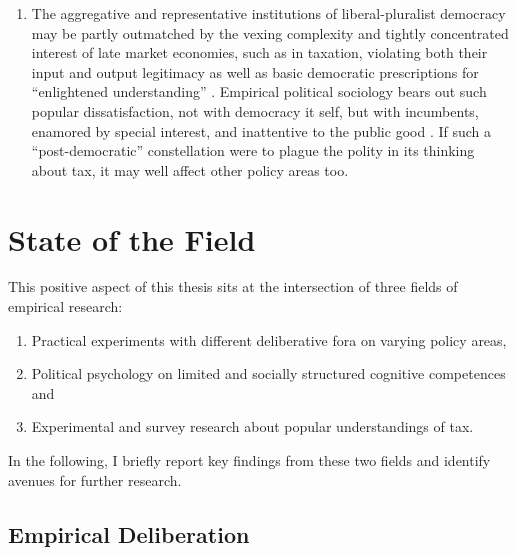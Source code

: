 \begin{enumerate}
	\item The aggregative and representative institutions of liberal-pluralist democracy may be partly outmatched by the vexing complexity \citep{Merton-1968-aa} and tightly concentrated interest \citep{Olson-1971-aa} of late market economies, such as in taxation, violating both their input and output legitimacy \citep{Scharpf1997} as well as basic democratic prescriptions for ``enlightened understanding'' \citep{Dahl-1989-aa}.
	Empirical political sociology bears out such popular dissatisfaction, not with democracy it self, but with incumbents, enamored by special interest, and inattentive to the public good \citep{NyeJr.1997,Norris2011,PutnamPharr-2000-aa}.
	If such a ``post-democratic'' constellation \citep{Crouch2004} were to plague the polity in its thinking about tax, it may well affect other policy areas too.
\end{enumerate}

\section{State of the Field}
This positive aspect of this thesis sits at the intersection of three fields of empirical research:
\begin{enumerate}
	\item Practical experiments with different deliberative fora on varying policy areas,

	\item Political psychology on limited and socially structured cognitive competences and

	\item Experimental and survey research about popular understandings of tax.
\end{enumerate}

In the following, I briefly report key findings from these two fields and identify avenues for further research.

\subsection{Empirical Deliberation}

